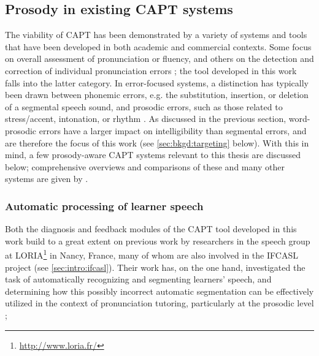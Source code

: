     \subsection{Prosody in existing CAPT systems}
	\label{sec:capt:systems}
		
	The viability of CAPT has been demonstrated by a variety of systems and tools that have been developed in both academic and commercial contexts. Some focus on overall assessment of pronunciation or fluency, and others on the detection and correction of individual pronunciation errors \citep{Eskenazi2009}; the tool developed in this work falls into the latter category. In error-focused systems, a distinction has typically been drawn between phonemic errors, e.g. the substitution, insertion, or deletion of a segmental speech sound, and prosodic errors, such as those related to stress/accent, intonation, or rhythm \citep{Witt2012}. As discussed in the previous section, word-prosodic errors have a larger impact on intelligibility than segmental errors, and are therefore the focus of this work (see \cref{sec:bkgd:targeting} below). With this in mind, a few prosody-aware CAPT systems relevant to this thesis are discussed below; comprehensive overviews and comparisons of these and many other systems are given by \textcite{Neri2002,Eskenazi2009,Delmonte2011,Witt2012}.  
	
	\subsubsection{Automatic processing of learner speech}
		
	Both the diagnosis and feedback modules of the CAPT tool developed in this work build to a great extent on previous work by researchers in the speech group at LORIA\footnote{\url{http://www.loria.fr/}} in Nancy, France, many of whom are also involved in the IFCASL project (see \cref{sec:intro:ifcasl}). 
	 Their work has, on the one hand, investigated the task of automatically recognizing and segmenting learners' speech, and determining how this possibly incorrect automatic segmentation can be effectively utilized in the context of pronunciation tutoring, particularly at the prosodic level \citep{Mesbahi2011,Orosanu2012}; 
	
